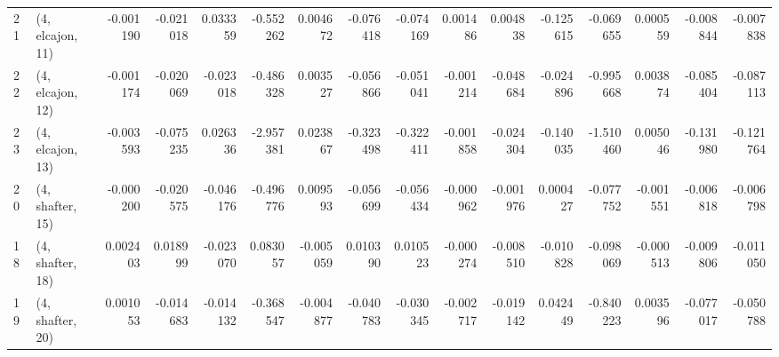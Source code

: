 \begin{tabular}{llrrrrrrrrrrrrrr}
21 &  (4, elcajon, 11) &  -0.001190 & -0.021018 &  0.033359 &  -0.552262 &  0.004672 &  -0.076418 & -0.074169 &  0.001486 &  0.004838 & -0.125615 &  -0.069655 &  0.000559 & -0.008844 & -0.007838 \\
22 &  (4, elcajon, 12) &  -0.001174 & -0.020069 & -0.023018 &  -0.486328 &  0.003527 &  -0.056866 & -0.051041 & -0.001214 & -0.048684 & -0.024896 &  -0.995668 &  0.003874 & -0.085404 & -0.087113 \\
23 &  (4, elcajon, 13) &  -0.003593 & -0.075235 &  0.026336 &  -2.957381 &  0.023867 &  -0.323498 & -0.322411 & -0.001858 & -0.024304 & -0.140035 &  -1.510460 &  0.005046 & -0.131980 & -0.121764 \\
20 &  (4, shafter, 15) &  -0.000200 & -0.020575 & -0.046176 &  -0.496776 &  0.009593 &  -0.056699 & -0.056434 & -0.000962 & -0.001976 &  0.000427 &  -0.077752 & -0.001551 & -0.006818 & -0.006798 \\
18 &  (4, shafter, 18) &   0.002403 &  0.018999 & -0.023070 &   0.083057 & -0.005059 &   0.010390 &  0.010523 & -0.000274 & -0.008510 & -0.010828 &  -0.098069 & -0.000513 & -0.009806 & -0.011050 \\
19 &  (4, shafter, 20) &   0.001053 & -0.014683 & -0.014132 &  -0.368547 & -0.004877 &  -0.040783 & -0.030345 & -0.002717 & -0.019142 &  0.042449 &  -0.840223 &  0.003596 & -0.077017 & -0.050788 \\
\bottomrule
\end{tabular}
